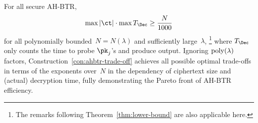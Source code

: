 \begin{corollary}\label{cor:lower-bound}
For all secure AH-BTR,
\begin{align*}
\max{|\ct|}\cdot\max{T_\Dec}\geq\frac{N}{1000}
\end{align*}
for all polynomially bounded~${N=N(\lambda)}$ and sufficiently large~$\lambda$,%
\footnote{The remarks following Theorem~\ref{thm:lower-bound}
are also applicable here.}
where $T_\Dec$ only counts the time to probe $\pk_j$'s and produce output.
Ignoring $\operatorname{poly}(\lambda)$ factors,
Construction~\ref{con:ahbtr-trade-off} achieves all possible optimal trade-offs
in terms of the exponents over~$N$ in the dependency of ciphertext size and (actual) decryption time,
fully demonstrating the Pareto front of AH-BTR efficiency.
\end{corollary}
